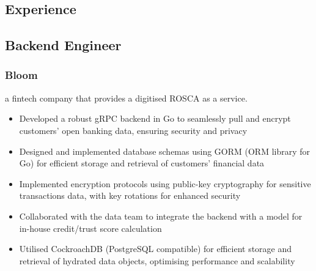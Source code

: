 \documentclass{article}
\begin{document}
\begin{paracol}{2}
  \raggedright
  \vspace{3pt}
  \section{Experience}
  \subsection{Backend Engineer}
  \subsubsection{Bloom}
  {\color{LightGrey}\scriptsize\href{https://www.bloommoney.co}{\faExternalLink}}
  \hspace*{\fill}{\color{TitleGrey}{\scriptsize\faCalendar}\hspace{5pt}{\small09/2023 -- Present}}
  
  {\noindent\small a fintech company that provides a digitised ROSCA as a service.}
  \begin{itemize}[leftmargin=*]
    \setlength\itemsep{-2pt}
    \item Developed a robust gRPC backend in Go to seamlessly pull and encrypt customers' open banking data, ensuring security and privacy
    \item Designed and implemented database schemas using GORM (ORM library for Go) for efficient storage and retrieval of customers' financial data
    \item Implemented encryption protocols using public-key cryptography for sensitive transactions data, with key rotations for enhanced security
    \item Collaborated with the data team to integrate the backend with a model for in-house credit/trust score calculation
    \item Utilised CockroachDB (PostgreSQL compatible) for efficient storage and retrieval of hydrated data objects, optimising performance and scalability
  \end{itemize}


\end{paracol}
\end{document}
